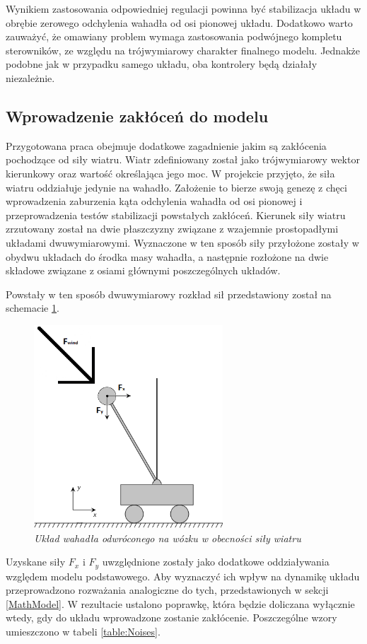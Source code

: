 \documentclass[12pt, oneside]{report}
\theoremstyle{definition}
\begin{document}
Wynikiem zastosowania odpowiedniej regulacji powinna być stabilizacja układu w obrębie zerowego odchylenia wahadła od osi pionowej układu. Dodatkowo warto zauważyć, że omawiany problem wymaga zastosowania podwójnego kompletu sterowników, ze względu na trójwymiarowy charakter finalnego modelu. Jednakże podobne jak w przypadku samego układu, oba kontrolery będą działały niezależnie.

\subsection{Wprowadzenie zakłóceń do modelu}
Przygotowana praca obejmuje dodatkowe zagadnienie jakim są zakłócenia pochodzące od siły wiatru. Wiatr zdefiniowany został jako trójwymiarowy wektor kierunkowy oraz wartość określająca jego moc. W projekcie przyjęto, że siła wiatru oddziałuje jedynie na wahadło. Założenie to bierze swoją genezę z chęci wprowadzenia zaburzenia kąta odchylenia wahadła od osi pionowej i przeprowadzenia testów stabilizacji powstałych zakłóceń. Kierunek siły wiatru zrzutowany został na dwie płaszczyzny związane z wzajemnie prostopadłymi układami dwuwymiarowymi.  Wyznaczone w ten sposób siły przyłożone zostały w obydwu układach do środka masy wahadła, a następnie rozłożone na dwie składowe związane z osiami głównymi poszczególnych układów. 

Powstały w ten sposób dwuwymiarowy rozkład sił przedstawiony został na schemacie \ref{WindForce}.

\begin{figure}[H]
	\centering
		\includegraphics[width = 200pt]{WindForce} 
		\caption{\textit{Układ wahadła odwróconego na wózku w obecności siły wiatru}}
		\label{WindForce}
\end{figure}

Uzyskane siły $F_x$ i $F_y$ uwzględnione zostały jako dodatkowe oddziaływania względem modelu podstawowego. Aby wyznaczyć ich wpływ na dynamikę układu przeprowadzono rozważania analogiczne do tych, przedstawionych w sekcji \ref{MathModel}. W rezultacie ustalono poprawkę, która będzie doliczana wyłącznie wtedy, gdy do układu wprowadzone zostanie zakłócenie. Poszczególne wzory umieszczono w tabeli \ref{table:Noises}.
\end{document}
